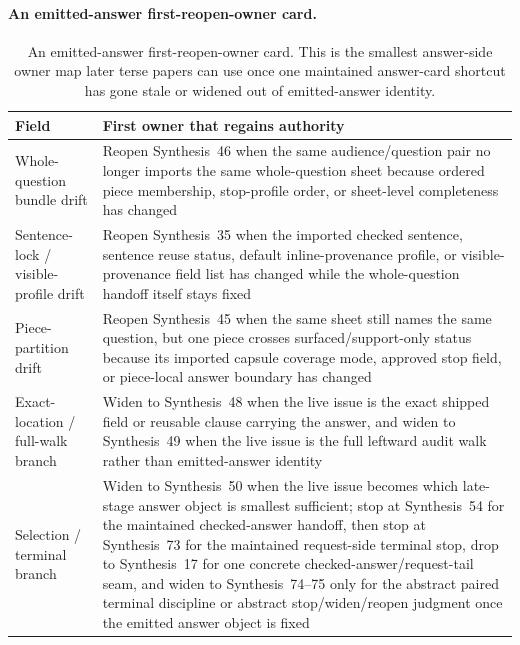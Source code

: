 \documentclass[11pt]{article}
\begin{document}
\paragraph{An emitted-answer first-reopen-owner card.}
\begin{table}[t]
\centering
\small
\begin{tabularx}{\linewidth}{@{}lX@{}}
\toprule
Field & First owner that regains authority \\
\midrule
Whole-question bundle drift & Reopen Synthesis~46 when the same audience/question pair no longer imports the same whole-question sheet because ordered piece membership, stop-profile order, or sheet-level completeness has changed \\
Sentence-lock / visible-profile drift & Reopen Synthesis~35 when the imported checked sentence, sentence reuse status, default inline-provenance profile, or visible-provenance field list has changed while the whole-question handoff itself stays fixed \\
Piece-partition drift & Reopen Synthesis~45 when the same sheet still names the same question, but one piece crosses surfaced/support-only status because its imported capsule coverage mode, approved stop field, or piece-local answer boundary has changed \\
Exact-location / full-walk branch & Widen to Synthesis~48 when the live issue is the exact shipped field or reusable clause carrying the answer, and widen to Synthesis~49 when the live issue is the full leftward audit walk rather than emitted-answer identity \\
Selection / terminal branch & Widen to Synthesis~50 when the live issue becomes which late-stage answer object is smallest sufficient; stop at Synthesis~54 for the maintained checked-answer handoff, then stop at Synthesis~73 for the maintained request-side terminal stop, drop to Synthesis~17 for one concrete checked-answer/request-tail seam, and widen to Synthesis~74--75 only for the abstract paired terminal discipline or abstract stop/widen/reopen judgment once the emitted answer object is fixed \\
\bottomrule
\end{tabularx}
\caption{An emitted-answer first-reopen-owner card. This is the smallest answer-side owner map later terse papers can use once one maintained answer-card shortcut has gone stale or widened out of emitted-answer identity.}
\label{tab:answer-card-first-reopen-owner}
\end{table}
\end{document}
